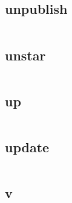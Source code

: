 \begin{lstlisting}[language=bash]

\end{lstlisting}

\subsection{unpublish}



\begin{lstlisting}[language=bash]

\end{lstlisting}

\subsection{unstar}




\begin{lstlisting}[language=bash]

\end{lstlisting}

\subsection{up}



\begin{lstlisting}[language=bash]

\end{lstlisting}

\subsection{update}



\begin{lstlisting}[language=bash]

\end{lstlisting}

\subsection{v}





\begin{lstlisting}[language=bash]

\end{lstlisting}

